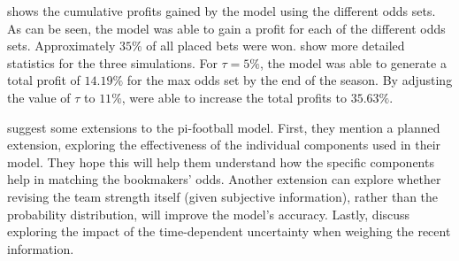  shows the cumulative profits gained by the model using the different odds sets. As can be seen, the model was able to gain a profit for each of the different odds sets. Approximately $35\%$ of all placed bets were won.  show more detailed statistics for the three simulations. For $\tau = 5\%$, the model was able to generate a total profit of $14.19\%$ for the max odds set by the end of the season. By adjusting the value of $\tau$ to $11\%$, \citet{bib:constantinou-fenton-neil-2012} were able to increase the total profits to $35.63\%$.

\citet{bib:constantinou-fenton-neil-2012} suggest some extensions to the pi-football model. First, they mention a planned extension, exploring the effectiveness of the individual components used in their model. They hope this will help them understand how the specific components help in matching the bookmakers' odds. Another extension can explore whether revising the team strength itself (given subjective information), rather than the probability distribution, will improve the model's accuracy. Lastly, \citet{bib:constantinou-fenton-neil-2012} discuss exploring the impact of the time-dependent uncertainty when weighing the recent information. 